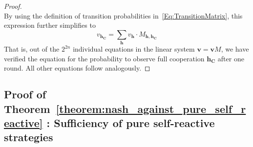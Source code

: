 \documentclass[11pt]{article}
\theoremstyle{plainCl1}
\theoremstyle{plainCl2}
\begin{document}
\begin{proof}
\begin{equation}
\end{equation}
By using the definition of transition probabilities in~\eqref{Eq:TransitionMatrix}, this expression further simplifies to
\begin{equation} 
v_\mathbf{h_C} = \sum_{\mathbf{h}} v_{\mathbf{h}} \cdot M_{\mathbf{h},\mathbf{h_C}}
\end{equation}
That is, out of the $2^{2n}$ individual equations in the linear system $\mathbf{v}\!=\!\mathbf{v} M$, we have verified the equation for the probability to observe full cooperation $\mathbf{h_C}$ after one round. All other equations follow analogously.
\end{proof}






\subsection{Proof of Theorem~\ref{theorem:nash_against_pure_self_reactive} : Sufficiency of pure self-reactive strategies}
\end{document}
